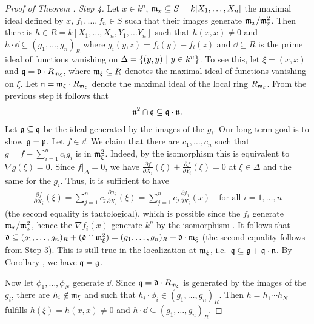 \documentclass[a4paper,parskip=half,numbers=enddot, DIV=12, headheight=30pt]{scrreprt}
\begin{document}
\begin{proof}[Proof of Theorem ]
    \emph{Step 4.} Let $x\in k^n$, $\mathfrak{m}_x \subseteq S= k[X_1,\ldots, X_n]$ the maximal ideal defined by $x$, $f_1,\ldots, f_n\in S$ such that their images generate $\mathfrak{m}_x/\mathfrak{m}_x^2$. Then there is $h\in R = k[X_1,\ldots, X_n,Y_1,\ldots Y_n]$ such that $h(x,x) \neq 0$ and $h\cdot \dd \subseteq (g_1,\ldots, g_n)_R$ where $g_i(y,z) = f_i(y)-f_i(z)$ and $\dd\subseteq R$ is the prime ideal of functions vanishing on $\Delta = \left\{(y,y)\ \middle|\  y\in k^n\right\}$. To see this, let $\xi = (x,x)$ and $\mathfrak{q} = \mathfrak{d} \cdot R_{\mathfrak{m}_\xi}$, where $\mathfrak{m}_\xi\subseteq R$ denotes the maximal ideal of functions vanishing on $\xi$. Let $\mathfrak{n} = \mathfrak{m}_\xi\cdot R_{\mathfrak{m}_\xi}$ denote the maximal ideal of the local ring $R_{\mathfrak{m}_\xi}$. From the previous step it follows that 
    \begin{align}\lbl{eq:thm15}
        \nn^2\cap \qq\subseteq \qq\cdot \nn .
    \end{align}
    Let $\mathfrak{g}\subseteq \mathfrak{q}$ be the ideal generated by the images of the $g_i$. Our long-term goal is to show $\mathfrak{g}=\mathfrak{p}$. Let $f\in \dd$. We claim that there are $c_1,\ldots,c_n$ such that $g=f-\sum_{i=1}^n c_i g_i$ is in $\mathfrak{m}_\xi^2$. Indeed, by the isomorphism  this is equivalent to $\nabla g(\xi)=0$. Since $f|_\Delta = 0$, we have $\frac{\partial f}{\partial X_i}(\xi) + \frac{\partial f}{\partial Y_i}(\xi) = 0$ at $\xi\in \Delta$ and the same for the $g_i$. Thus, it is sufficient to have 
    \begin{align*}
        \frac{\partial f}{\partial X_i}(\xi) = \sum_{j=1}^n c_j \frac{\partial g_j}{\partial X_i}(\xi) = \sum_{j=1}^n c_j \frac{\partial f_j}{\partial X_i}(x)\quad\text{for all }i=1,\ldots,n
    \end{align*}
    (the second equality is tautological), which is possible since the $f_i$ generate $\mathfrak{m}_x/\mathfrak{m}_x^2$, hence the $\nabla f_i(x)$ generate $k^n$ by the isomorphism . It follows that $\mathfrak{d}\subseteq (g_1,\ldots,g_n)_R + (\mathfrak{d}\cap \mathfrak{m}_\xi^2) = (g_1,\ldots,g_n)_R + \mathfrak{d}\cdot \mathfrak{m}_\xi$ (the second equality follows from Step 3). This is still true in the localization at $\mathfrak{m}_\xi$, i.e.\ $\mathfrak{q}\subseteq \mathfrak{g} +\mathfrak{q}\cdot\mathfrak{n}$. By Corollary , we have $\mathfrak{q}= \mathfrak{g}$. 
    
    Now let $\phi_1,\ldots,\phi_N$ generate $\dd$. Since $\mathfrak{q} =\mathfrak{d}\cdot R_{\mathfrak{m}_\xi}$ is generated by the images of the $g_i$, there are $h_i\not\in \mathfrak{m}_\xi$ and such that $h_i\cdot \phi_i \in(g_1,\ldots,g_n)_R$. Then $h=h_1\cdots h_N$ fulfills $h(\xi)=h(x,x)\not=0$ and $h\cdot\dd\subseteq(g_1,\ldots,g_n)_R$.
    

\end{proof}
\end{document}
